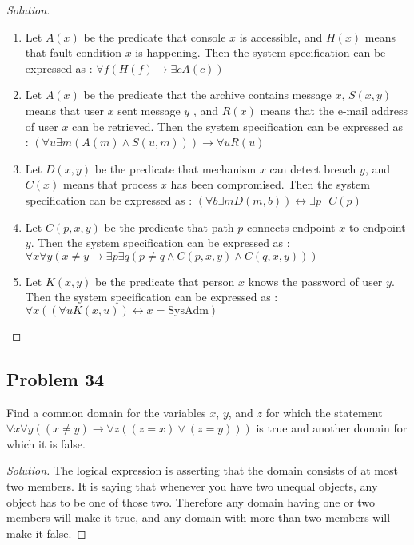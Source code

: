 \documentclass{article}
\newenvironment{solution}{\renewcommand\qedsymbol{}\begin{proof}[Solution]}{\end{proof}}
\begin{document}
\begin{solution}
\hspace{1pt}

\begin{enumerate}
\item Let $A(x)$ be the predicate that console $x$ is accessible, and $H(x)$ means that fault condition $x$ is happening. Then the system specification can be expressed as : $\forall f(H(f) \rightarrow \exists cA(c))$
\item Let $A(x)$ be the predicate that the archive contains message $x$, $S(x,y)$ means that user $x$ sent message $y$ , and $R(x)$ means that the e-mail address of user $x$ can be retrieved. Then the system specification can be expressed as : $(\forall u \exists m(A(m) \land S(u,m))) \rightarrow \forall uR(u)$
\item Let $D(x,y)$ be the predicate that mechanism $x$ can detect breach $y$, and $C(x)$ means that process $x$ has been compromised. Then the system specification can be expressed as : $(\forall b \exists mD(m,b)) \leftrightarrow \exists p \neg C(p)$
\item Let $C(p,x,y)$ be the predicate that path $p$ connects endpoint $x$ to endpoint $y$. Then the system specification can be expressed as :\\$\forall x \forall y(x \neq y \rightarrow \exists p \exists q(p \neq q \land C(p,x,y) \land C(q,x,y)))$
\item Let $K(x,y)$ be the predicate that person $x$ knows the password of user $y$. Then the system specification can be expressed as :\\$\forall x((\forall uK(x,u)) \leftrightarrow x = \textrm{SysAdm})$
\end{enumerate}
\end{solution}

\clearpage
\subsection*{Problem 34}
Find a common domain for the variables $x$, $y$, and $z$ for which the statement $\forall x \forall y((x \neq y) \rightarrow \forall z((z = x) \lor (z = y)))$ is true and another domain for which it is false.

\begin{solution}
The logical expression is asserting that the domain consists of at most two members. It is saying that whenever you have two unequal objects, any object has to be one of those two. Therefore any domain having one or two members will make it true, and any domain with more than two members will make it false.
\end{solution}
\end{document}
